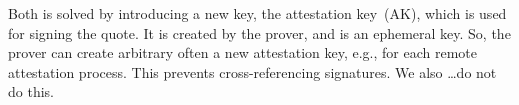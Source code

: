 Both is solved by introducing a new key, the attestation key~(AK), which is used for signing the quote.
It is created by the prover, and is an ephemeral key.
So, the prover can create arbitrary often a new attestation key, e.g., for each remote attestation process.
This prevents cross-referencing signatures.
We also \ldots do not do this.







